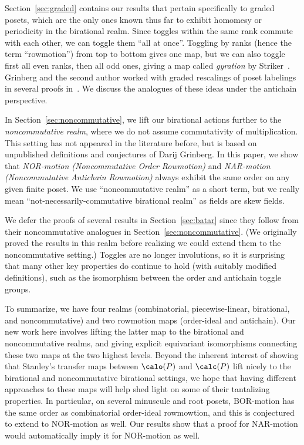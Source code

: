 Section~\ref{sec:graded} contains our results that pertain specifically to graded
posets, which are the only ones known thus far to exhibit homomesy or periodicity in the birational realm. 
Since toggles within the same rank commute with each other, we can toggle them ``all at
once''. Toggling by ranks (hence the term ``rowmotion'') from top to bottom gives one map,
but we can also toggle first all even ranks, then all odd ones, giving a map
called \textit{gyration} by Striker~\cite{strikerRS}. 
Grinberg and the second author worked with graded rescalings of
poset labelings in several proofs in~\cite{GrRo15,GrRo16}.
We discuss the analogues of these ideas under the antichain perspective.

In Section~\ref{sec:noncommutative}, we lift our birational actions
further to the \emph{noncommutative realm}, where we do not assume commutativity
of multiplication. This setting has not appeared in the literature before, but is based on
unpublished definitions and conjectures of Darij Grinberg. 
In this paper, we show that \emph{NOR-motion (Noncommutative Order Rowmotion)} and
\emph{NAR-motion (Noncommutative Antichain Rowmotion)} 
always exhibit the same order on any given finite poset.
We use ``noncommutative realm'' as a short term, but we really mean
``not-necessarily-commutative birational realm'' as fields are skew fields. 

We defer the proofs of several results in Section~\ref{sec:batar} since they follow from their
noncommutative analogues in Section~\ref{sec:noncommutative}. 
(We originally proved the results in this realm before realizing we could extend
them to the noncommutative setting.) 
Toggles are no longer involutions, so it is surprising that many other key properties do continue to hold
(with suitably modified definitions), such as
the isomorphism between the order and antichain toggle groups. 

To summarize, we have four realms (combinatorial, piecewise-linear, birational, and
noncommutative) and two rowmotion maps (order-ideal and antichain). Our new work here
involves lifting the latter map to the birational and noncommutative realms, and giving
explicit equivariant isomorphisms connecting these two maps at the two highest levels. 
Beyond the inherent interest of showing that Stanley's transfer maps between $\calo (P)$ and
$\calc (P)$ lift nicely to the birational and noncommutative birational settings, we hope
that having different approaches to these maps will help shed light on some of their
tantalizing properties. In particular, on several minuscule and root posets, BOR-motion has
the same order as combinatorial
order-ideal rowmowtion, and this is conjectured to extend to NOR-motion as well. Our
results show that a proof for NAR-motion would automatically imply it for NOR-motion as
well. 

